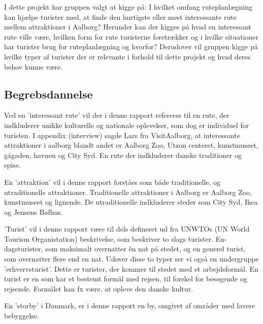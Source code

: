 I dette projekt har gruppen valgt at kigge på: I hvilket omfang ruteplanlægning kan hjælpe turister med, at finde den hurtigste eller mest interessante rute mellem attraktioner i Aalborg? Herunder kan der kigges på hvad en interessant rute ville være, hvilken form for rute turisterne foretrækker og i hvilke situationer har turister brug for ruteplanlægning og hvorfor? Derudover vil gruppen kigge på hvilke typer af turister der er relevante i forhold til dette projekt og hvad deres behov kunne være. \newline \newpage

\subsection{Begrebsdannelse}
Ved en ’interessant rute’ vil der i denne rapport refereres til en rute, der indkluderer unikke kulturelle og nationale oplevelser, som dog er individuel for turisten. I appendix (interview) sagde Lars fra VisitAalborg, at interessante attraktioner i aalborg blandt andet er Aalborg Zoo, Utzon centeret, kunstmuseet, gågaden, havnen og City Syd. En rute der indkluderer danske traditioner og spise. \newline

En ’attraktion’ vil i denne rapport forståes som både traditionelle, og utraditionelle attraktioner. Traditionelle attraktioner i Aalborg er Aalborg Zoo, kunstmuseet og lignende. De utraditionelle indkluderer steder som City Syd, Ikea og Jensens Bøfhus. \newline 

’Turist’ vil i denne rapport være til dels defineret ud fra UNWTOs (UN World Tourism Organistation) beskrivelse, som beskriver to slags turister. En-dagsturister, som maksimalt overnatter én nat på stedet, og en generel turist, som overnatter flere end en nat. Udover disse to typer ser vi også en undergruppe ’erhvervsturist’. Dette er turister, der kommer til stedet med et arbejdsformål. 
En turist er en som har et bestemt formål med rejsen, til forskel for besøgende og rejsende. Formålet kan fx være, at opleve den danske kultur.  \newline

En ’storby’ i Danmark, er i denne rapport en by, omgivet af områder med lavere bebyggelse.
